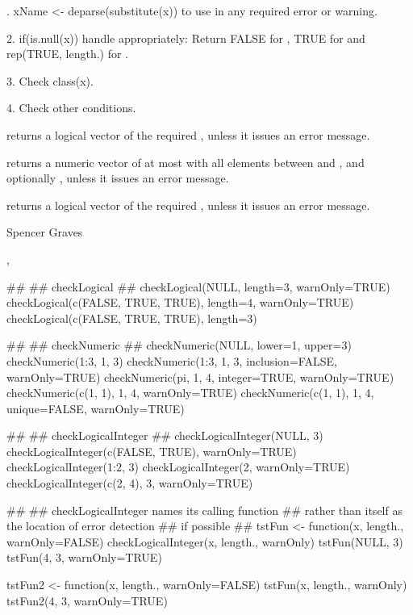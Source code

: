 \begin{Details}.  xName <- deparse(substitute(x)) to use in any required error or
warning.  

2.  if(is.null(x)) handle appropriately:  Return FALSE for
, TRUE for  and rep(TRUE,
length.) for .  

3.  Check class(x).

4.  Check other conditions.
\end{Details}
\begin{Value}
 returns a logical vector of the required
, unless it issues an error message.

 returns a numeric vector of at most 
with all elements between  and , and
optionally , unless it issues an error message.

 returns a logical vector of the required
, unless it issues an error message.
\end{Value}
\begin{Author}\relax
Spencer Graves
\end{Author}
\begin{SeeAlso}\relax
{},
\end{SeeAlso}
\begin{Examples}
\begin{ExampleCode}
##
## checkLogical
##
checkLogical(NULL, length=3, warnOnly=TRUE)
checkLogical(c(FALSE, TRUE, TRUE), length=4, warnOnly=TRUE)
checkLogical(c(FALSE, TRUE, TRUE), length=3)

##
## checkNumeric
##
checkNumeric(NULL, lower=1, upper=3)
checkNumeric(1:3, 1, 3)
checkNumeric(1:3, 1, 3, inclusion=FALSE, warnOnly=TRUE)
checkNumeric(pi, 1, 4, integer=TRUE, warnOnly=TRUE)
checkNumeric(c(1, 1), 1, 4, warnOnly=TRUE)
checkNumeric(c(1, 1), 1, 4, unique=FALSE, warnOnly=TRUE)

##
## checkLogicalInteger
##
checkLogicalInteger(NULL, 3)
checkLogicalInteger(c(FALSE, TRUE), warnOnly=TRUE) 
checkLogicalInteger(1:2, 3) 
checkLogicalInteger(2, warnOnly=TRUE) 
checkLogicalInteger(c(2, 4), 3, warnOnly=TRUE)

##
## checkLogicalInteger names its calling function 
## rather than itself as the location of error detection
## if possible
##
tstFun <- function(x, length., warnOnly=FALSE){
   checkLogicalInteger(x, length., warnOnly) 
}
tstFun(NULL, 3)
tstFun(4, 3, warnOnly=TRUE)

tstFun2 <- function(x, length., warnOnly=FALSE){
   tstFun(x, length., warnOnly)
}
tstFun2(4, 3, warnOnly=TRUE)

\end{ExampleCode}
\end{Examples}

